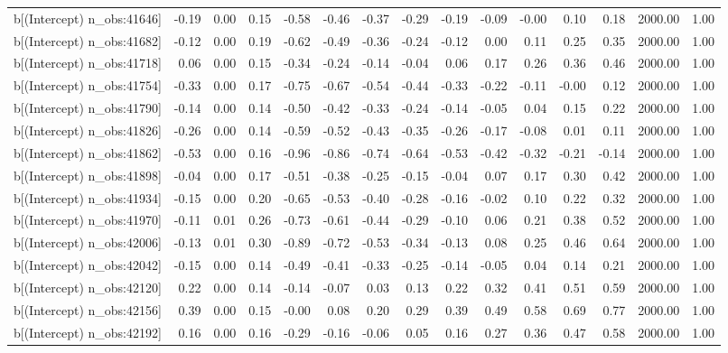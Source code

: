 \begin{table}[ht]
\begin{tabular}{rrrrrrrrrrrrrrr}
  b[(Intercept) n\_obs:41646] & -0.19 & 0.00 & 0.15 & -0.58 & -0.46 & -0.37 & -0.29 & -0.19 & -0.09 & -0.00 & 0.10 & 0.18 & 2000.00 & 1.00 \\ 
  b[(Intercept) n\_obs:41682] & -0.12 & 0.00 & 0.19 & -0.62 & -0.49 & -0.36 & -0.24 & -0.12 & 0.00 & 0.11 & 0.25 & 0.35 & 2000.00 & 1.00 \\ 
  b[(Intercept) n\_obs:41718] & 0.06 & 0.00 & 0.15 & -0.34 & -0.24 & -0.14 & -0.04 & 0.06 & 0.17 & 0.26 & 0.36 & 0.46 & 2000.00 & 1.00 \\ 
  b[(Intercept) n\_obs:41754] & -0.33 & 0.00 & 0.17 & -0.75 & -0.67 & -0.54 & -0.44 & -0.33 & -0.22 & -0.11 & -0.00 & 0.12 & 2000.00 & 1.00 \\ 
  b[(Intercept) n\_obs:41790] & -0.14 & 0.00 & 0.14 & -0.50 & -0.42 & -0.33 & -0.24 & -0.14 & -0.05 & 0.04 & 0.15 & 0.22 & 2000.00 & 1.00 \\ 
  b[(Intercept) n\_obs:41826] & -0.26 & 0.00 & 0.14 & -0.59 & -0.52 & -0.43 & -0.35 & -0.26 & -0.17 & -0.08 & 0.01 & 0.11 & 2000.00 & 1.00 \\ 
  b[(Intercept) n\_obs:41862] & -0.53 & 0.00 & 0.16 & -0.96 & -0.86 & -0.74 & -0.64 & -0.53 & -0.42 & -0.32 & -0.21 & -0.14 & 2000.00 & 1.00 \\ 
  b[(Intercept) n\_obs:41898] & -0.04 & 0.00 & 0.17 & -0.51 & -0.38 & -0.25 & -0.15 & -0.04 & 0.07 & 0.17 & 0.30 & 0.42 & 2000.00 & 1.00 \\ 
  b[(Intercept) n\_obs:41934] & -0.15 & 0.00 & 0.20 & -0.65 & -0.53 & -0.40 & -0.28 & -0.16 & -0.02 & 0.10 & 0.22 & 0.32 & 2000.00 & 1.00 \\ 
  b[(Intercept) n\_obs:41970] & -0.11 & 0.01 & 0.26 & -0.73 & -0.61 & -0.44 & -0.29 & -0.10 & 0.06 & 0.21 & 0.38 & 0.52 & 2000.00 & 1.00 \\ 
  b[(Intercept) n\_obs:42006] & -0.13 & 0.01 & 0.30 & -0.89 & -0.72 & -0.53 & -0.34 & -0.13 & 0.08 & 0.25 & 0.46 & 0.64 & 2000.00 & 1.00 \\ 
  b[(Intercept) n\_obs:42042] & -0.15 & 0.00 & 0.14 & -0.49 & -0.41 & -0.33 & -0.25 & -0.14 & -0.05 & 0.04 & 0.14 & 0.21 & 2000.00 & 1.00 \\ 
  b[(Intercept) n\_obs:42120] & 0.22 & 0.00 & 0.14 & -0.14 & -0.07 & 0.03 & 0.13 & 0.22 & 0.32 & 0.41 & 0.51 & 0.59 & 2000.00 & 1.00 \\ 
  b[(Intercept) n\_obs:42156] & 0.39 & 0.00 & 0.15 & -0.00 & 0.08 & 0.20 & 0.29 & 0.39 & 0.49 & 0.58 & 0.69 & 0.77 & 2000.00 & 1.00 \\ 
  b[(Intercept) n\_obs:42192] & 0.16 & 0.00 & 0.16 & -0.29 & -0.16 & -0.06 & 0.05 & 0.16 & 0.27 & 0.36 & 0.47 & 0.58 & 2000.00 & 1.00 \\ 

\end{tabular}
\end{table}

